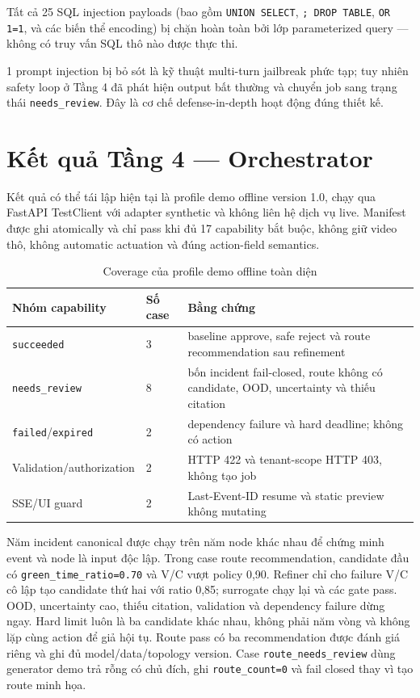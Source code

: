 Tất cả 25 SQL injection payloads (bao gồm \texttt{UNION SELECT}, \texttt{; DROP TABLE}, \texttt{OR 1=1}, và các biến thể encoding) bị chặn hoàn toàn bởi lớp parameterized query --- không có truy vấn SQL thô nào được thực thi.

1 prompt injection bị bỏ sót là kỹ thuật multi-turn jailbreak phức tạp; tuy nhiên safety loop ở Tầng 4 đã phát hiện output bất thường và chuyển job sang trạng thái \texttt{needs\_review}. Đây là cơ chế defense-in-depth hoạt động đúng thiết kế.



\section{Kết quả Tầng 4 --- Orchestrator}
\label{sec:eval_t4_verified}

Kết quả có thể tái lập hiện tại là profile demo offline version 1.0, chạy qua
FastAPI TestClient với adapter synthetic và không liên hệ dịch vụ live. Manifest
được ghi atomically và chỉ pass khi đủ 17 capability bắt buộc, không giữ video
thô, không automatic actuation và đúng action-field semantics.

\begin{table}[H]
\centering
\caption{Coverage của profile demo offline toàn diện}
\label{tab:t4_offline_verified}
\begin{tabular}{p{4.2cm} p{2cm} p{6cm}}
\toprule
\textbf{Nhóm capability} & \textbf{Số case} & \textbf{Bằng chứng} \\
\midrule
\texttt{succeeded} & 3 & baseline approve, safe reject và route recommendation sau refinement \\
\rowcolor{rowgray}
\texttt{needs\_review} & 8 & bốn incident fail-closed, route không có candidate, OOD, uncertainty và thiếu citation \\
\texttt{failed}/\texttt{expired} & 2 & dependency failure và hard deadline; không có action \\
\rowcolor{rowgray}
Validation/authorization & 2 & HTTP 422 và tenant-scope HTTP 403, không tạo job \\
SSE/UI guard & 2 & Last-Event-ID resume và static preview không mutating \\
\bottomrule
\end{tabular}
\end{table}

Năm incident canonical được chạy trên năm node khác nhau để chứng minh event và
node là input độc lập. Trong case route recommendation, candidate đầu có
\texttt{green\_time\_ratio=0.70} và
V/C vượt policy 0,90. Refiner chỉ cho failure V/C cô lập tạo candidate thứ hai
với ratio 0,85; surrogate chạy lại và các gate pass. OOD, uncertainty cao, thiếu
citation, validation và dependency failure dừng ngay. Hard limit luôn là ba
candidate khác nhau, không phải năm vòng và không lặp cùng action để giả hội tụ.
Route pass có ba recommendation được đánh giá riêng và ghi đủ
model/data/topology version. Case \texttt{route\_needs\_review} dùng generator
demo trả rỗng có chủ đích, ghi \texttt{route\_count=0} và fail closed thay vì
tạo route minh họa.

